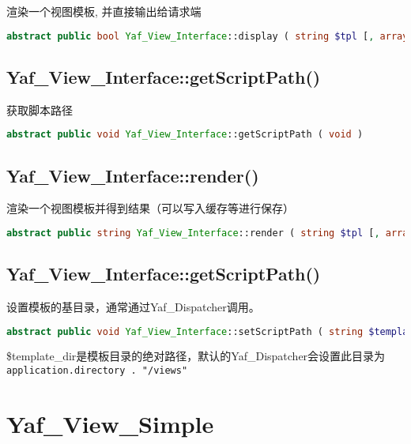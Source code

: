 渲染一个视图模板, 并直接输出给请求端


\begin{lstlisting}[language=PHP]
abstract public bool Yaf_View_Interface::display ( string $tpl [, array $tpl_vars ] )
\end{lstlisting}





\section{Yaf\_View\_Interface::getScriptPath()}

获取脚本路径

\begin{lstlisting}[language=PHP]
abstract public void Yaf_View_Interface::getScriptPath ( void )
\end{lstlisting}

\section{Yaf\_View\_Interface::render()}

渲染一个视图模板并得到结果（可以写入缓存等进行保存）

\begin{lstlisting}[language=PHP]
abstract public string Yaf_View_Interface::render ( string $tpl [, array $tpl_vars ] )
\end{lstlisting}


\section{Yaf\_View\_Interface::getScriptPath()}

设置模板的基目录，通常通过Yaf\_Dispatcher调用。



\begin{lstlisting}[language=PHP]
abstract public void Yaf_View_Interface::setScriptPath ( string $template_dir )
\end{lstlisting}


\$template\_dir是模板目录的绝对路径，默认的Yaf\_Dispatcher会设置此目录为\texttt{application.directory . "/views"}

\chapter{Yaf\_View\_Simple}



